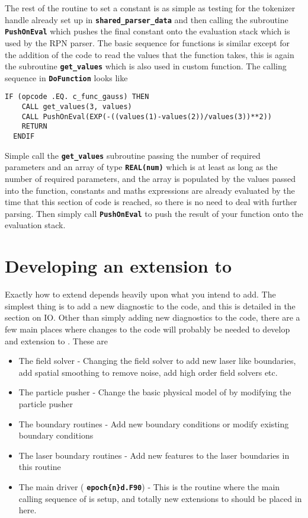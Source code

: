 \documentclass[12pt,a4paper]{article}
\newcommand{\simpleboxverbatim}{\begin{Verbatim}[obeytabs=true,frame=single,
  framerule=0.5mm,rulecolor=\color{warwickmid},formatcom=\color{black}]}
\newcommand{\inlinecode}[1]{{\color{warwickred} \bf\texttt{#1}}}
\newcommand{\EPOCH}{{\color{warwickdark}\fontfamily{phv}\selectfont{EPOCH}}}
\begin{document}
The rest of the routine to set a constant is as simple as testing for the
tokenizer handle already set up in \inlinecode{shared\_parser\_data} and then
calling the subroutine \inlinecode{PushOnEval} which pushes the final constant
onto the evaluation stack which is used by the RPN parser. The basic sequence
for functions is similar except for the addition of the code to read the values
that the function takes, this is again the subroutine \inlinecode{get\_values}
which is also used in custom function. The calling sequence in
\inlinecode{DoFunction} looks like

\simpleboxverbatim
  IF (opcode .EQ. c_func_gauss) THEN
    CALL get_values(3, values)
    CALL PushOnEval(EXP(-((values(1)-values(2))/values(3))**2))
    RETURN
  ENDIF
\end{Verbatim}
Simple call the \inlinecode{get\_values} subroutine passing the number of
required parameters and an array of type \inlinecode{REAL(num)} which is at
least as long as the number of required parameters, and the array is populated
by the values passed into the function, constants and maths expressions are
already evaluated by the time that this section of code is reached, so there is
no need to deal with further parsing. Then simply call \inlinecode{PushOnEval}
to push the result of your function onto the evaluation stack.

\section{Developing an extension to {\EPOCH}}

Exactly how to extend {\EPOCH} depends heavily upon what you intend to add. The
simplest thing is to add a new diagnostic to the code, and this is detailed in
the section on {\EPOCH} IO. Other than simply adding new diagnostics to the code,
there are a few main places where changes to the code will probably be needed
to develop and extension to \EPOCH. These are
\begin{itemize}
\item The field solver - Changing the field solver to add new laser like
  boundaries, add spatial smoothing to remove noise, add high order field
  solvers etc.
\item The particle pusher - Change the basic physical model of {\EPOCH} by
  modifying the particle pusher
\item The boundary routines - Add new boundary conditions or modify existing
  boundary conditions
\item The laser boundary routines - Add new features to the laser boundaries in
  this routine
\item The main driver (\inlinecode{epoch\{n\}d.F90}) - This is the routine
  where the main calling sequence of {\EPOCH} is setup, and totally new
  extensions to {\EPOCH} should be placed in here.
\end{itemize}
\end{document}
